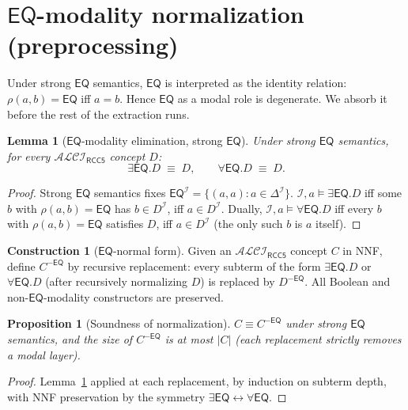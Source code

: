 \documentclass[11pt]{article}
\newtheorem{lemma}[theorem]{Lemma}
\newtheorem{proposition}[theorem]{Proposition}
\theoremstyle{definition}
\newtheorem{construction}[theorem]{Construction}
\theoremstyle{remark}
\newcommand{\EQ}{\mathsf{EQ}}
\newcommand{\ALCIRCC}[1]{\mathcal{ALCI}_{\mathsf{RCC#1}}}
\begin{document}
\section{$\EQ$-modality normalization (preprocessing)}
\label{sec:eq-normalization}

Under strong $\EQ$ semantics, $\EQ$ is interpreted as the identity
relation: $\rho(a,b)=\EQ$ iff $a=b$.  Hence $\EQ$ as a modal role
is degenerate.  We absorb it before the rest of the extraction
runs.

\begin{lemma}[$\EQ$-modality elimination, strong $\EQ$]
\label{lem:eq-norm}
Under strong $\EQ$ semantics, for every $\ALCIRCC{5}$ concept $D$:
\[
  \exists\EQ.D \;\equiv\; D,
  \qquad
  \forall\EQ.D \;\equiv\; D.
\]
\end{lemma}

\begin{proof}
Strong $\EQ$ semantics fixes
$\EQ^{\mathcal{I}} = \{(a,a) : a\in\Delta^{\mathcal{I}}\}$.
$\mathcal{I},a\models\exists\EQ.D$ iff some $b$ with
$\rho(a,b)=\EQ$ has $b\in D^{\mathcal{I}}$, iff $a\in D^{\mathcal{I}}$.
Dually, $\mathcal{I},a\models\forall\EQ.D$ iff every $b$ with
$\rho(a,b)=\EQ$ satisfies $D$, iff $a\in D^{\mathcal{I}}$ (the only
such $b$ is $a$ itself).
\end{proof}

\begin{construction}[$\EQ$-normal form]\label{con:eq-nf}
Given an $\ALCIRCC{5}$ concept $C$ in NNF, define $C^{-\EQ}$ by
recursive replacement: every subterm of the form $\exists\EQ.D$ or
$\forall\EQ.D$ (after recursively normalizing $D$) is replaced by
$D^{-\EQ}$.  All Boolean and non-$\EQ$-modality constructors are
preserved.
\end{construction}

\begin{proposition}[Soundness of normalization]\label{prop:eq-nf-sound}
$C \equiv C^{-\EQ}$ under strong $\EQ$ semantics, and the size of
$C^{-\EQ}$ is at most $|C|$ (each replacement strictly removes a
modal layer).
\end{proposition}

\begin{proof}
Lemma~\ref{lem:eq-norm} applied at each replacement, by induction
on subterm depth, with NNF preservation by the symmetry $\exists\EQ
\leftrightarrow \forall\EQ$.
\end{proof}
\end{document}
